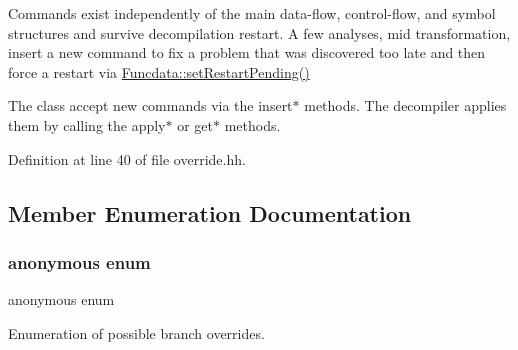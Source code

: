 Commands exist independently of the main data-\/flow, control-\/flow, and symbol structures and survive decompilation restart. A few analyses, mid transformation, insert a new command to fix a problem that was discovered too late and then force a restart via \mbox{\hyperlink{class_funcdata_af21c852eb9f606c5cd19fb2456927ecd}{Funcdata\+::set\+Restart\+Pending()}}

The class accept new commands via the insert$\ast$ methods. The decompiler applies them by calling the apply$\ast$ or get$\ast$ methods. 

Definition at line 40 of file override.\+hh.



\subsection{Member Enumeration Documentation}
\mbox{\label{class_override_ad0215b6acd10d018a59e257fe4d39a06}} 
\subsubsection{\texorpdfstring{anonymous enum}{anonymous enum}}
{\footnotesize\ttfamily anonymous enum}



Enumeration of possible branch overrides. 

